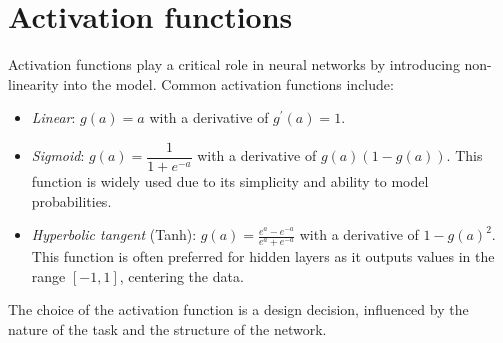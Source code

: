 \section{Activation functions}

Activation functions play a critical role in neural networks by introducing non-linearity into the model. 
Common activation functions include:
\begin{itemize}
    \item \textit{Linear}: $g(a)=a$ with a derivative of $g^\prime (a)=1$. 
    \item \textit{Sigmoid}: $g(a)=\dfrac{1}{1+e^{-a}}$ with a derivative of $g(a)(1-g(a))$. 
        This function is widely used due to its simplicity and ability to model probabilities.
    \item \textit{Hyperbolic tangent} (Tanh): $g(a)=\frac{e^a-e^{-a}}{e^a+e^{-a}}$ with a derivative of $1-g(a)^2$.
        This function is often preferred for hidden layers as it outputs values in the range $[-1,1]$, centering the data.
\end{itemize}
The choice of the activation function is a design decision, influenced by the nature of the task and the structure of the network.

